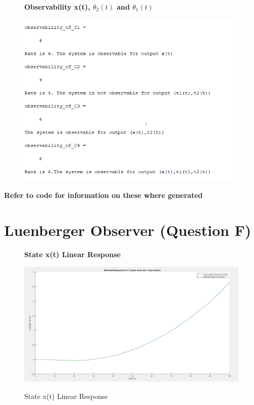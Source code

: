 \documentclass[12pt]{article}
\begin{document}
\begin{figure}[H]
    \centering
    \textbf{Observability x(t), $\theta_2(t)$ and $\theta_1(t)$ }\par\medskip
    \includegraphics[scale = 0.8]{out.png}\\[0.0 cm]	%
\end{figure}
\textbf{Refer to code for information on these where generated}
\section{Luenberger Observer (Question F)}
\begin{figure}[H]
    \centering
    \textbf{State x(t) Linear Response}\par\medskip
    \includegraphics[scale = 0.35]{StateXlinearResponse.png}\\[0.0 cm]	%
    \caption{State x(t) Linear Response} 
\end{figure}
\end{document}
